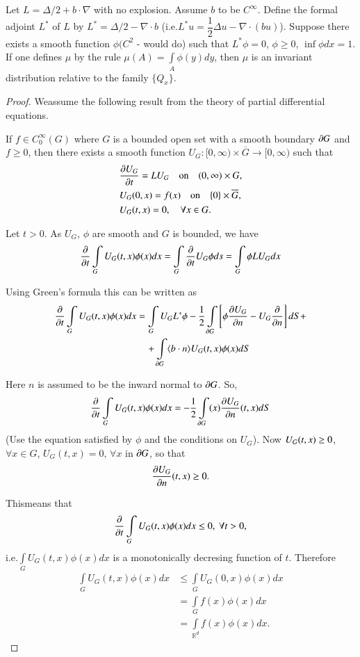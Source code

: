 \begin{theorem*}
Let $L=\Delta/2+b\cdot \nabla$ with no explosion. Assume $b$ to be
$C^{\infty}$. Define the formal adjoint $L^{*}$ of $L$ by
$L^{*}=\Delta/2-\nabla\cdot b$ (i.e.\@ $L^{*}u=\dfrac{1}{2}\Delta
u-\nabla\cdot (bu)$). Suppose there exists a smooth function
$\phi(C^{2}$ - would do) such that $L^{*}\phi=0$, $\phi\geq 0$,
$\inf\phi dx=1$. If one defines $\mu$ by the rule
$\mu(A)=\int\limits_{A}\phi(y)dy$, then $\mu$ is an invariant
distribution relative to the family $\{Q_{x}\}$.
\end{theorem*}

\begin{proof}
We\pageoriginale assume the following result from the theory of
partial differential equations. 

If $f\in C^{\infty}_{0}(G)$ where $G$ is a bounded open set with a
smooth boundary $\partial G$ and $f\geq 0$, then there exists a smooth
function $U_{G}:[0,\infty)\times \overline{G}\to [0,\infty)$ such that
\begin{align*}
& \frac{\partial U_{G}}{\partial t}=LU_{G}\quad\text{on}\quad (0,\infty)\times G,\\
& U_{G}(0,x)=f(x)\quad\text{on}\quad \{0\}\times \overline{G},\\
& U_{G}(t,x)=0,\quad \forall x\in G.
\end{align*}

Let $t>0$. As $U_{G}$, $\phi$ are smooth and $G$ is bounded, we have
$$
\frac{\partial}{\partial
  t}\int\limits_{G}U_{G}(t,x)\phi(x)dx=\int\limits_{G}\frac{\partial}{\partial
  t}U_{G}\phi ds=\int\limits_{G}\phi LU_{G}dx
$$

Using Green's formula this can be written as
\begin{align*}
\frac{\partial}{\partial t}\int\limits_{G}U_{G}(t,x)\phi(x)dx &=
\int\limits_{G}U_{G}L^{*}\phi-\frac{1}{2}\int\limits_{\partial
  G}\left[\phi\frac{\partial U_{G}}{\partial n}-U_{G}\frac{\partial}{\partial n}\right]dS+\\
&\quad +\int\limits_{\partial G}\langle b\cdot n\rangle U_{G}(t,x)\phi(x)dS
\end{align*}

Here $n$ is assumed to be the inward normal to $\partial G$. So,
$$
\frac{\partial}{\partial
  t}\int\limits_{G}U_{G}(t,x)\phi(x)dx=-\frac{1}{2}\int\limits_{\partial
  G}(x)\frac{\partial U_{G}}{\partial n}(t,x)dS
$$
(Use the equation satisfied by $\phi$ and the conditions on
$U_{G}$). Now $U_{G}(t,x)\break \geq 0$, $\forall x\in G$, $U_{G}(t,x)=0$,
$\forall x$ in $\partial G$, so that
$$
\frac{\partial U_{G}}{\partial n}(t,x)\geq 0.
$$

This\pageoriginale means that
$$
\frac{\partial}{\partial t}\int\limits_{G}U_{G}(t,x)\phi(x)dx\leq 0,\ \forall t>0,
$$
i.e.\@ $\int\limits_{G}U_{G}(t,x)\phi(x)dx$ is a monotonically
decresing function of $t$. Therefore
\begin{align*}
\int\limits_{G}U_{G}(t,x)\phi(x)dx &\leq
\int\limits_{G}U_{G}(0,x)\phi(x)dx\\
&= \int\limits_{G}f(x)\phi(x)dx\\
&= \int\limits_{\mathbb{R}^{d}}f(x)\phi(x)dx.
\end{align*}


\end{proof}
